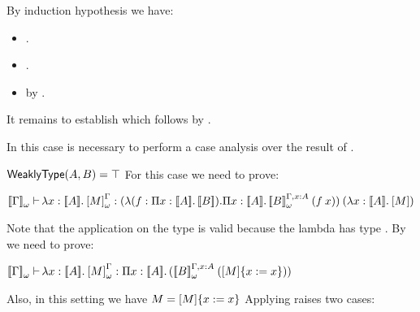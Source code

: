 \begin{Proof}
\begin{ProofCase}{\CicConv}
By induction hypothesis we have:
\begin{itemize}
    \item {}.
    \item {}.
    \item {} by .
\end{itemize}
It remains to establish
 which follows by 
\CicConv.
\end{ProofCase}

\begin{ProofCase}{\CicAbs}
In this case is necessary to perform a case analysis over the result of \weaklypropFun{}.
\begin{SubProofCase}{$\weaklypropFun[A,B] = \True$}
For this case we need to prove:
\begin{center}
$\ctyping[][\WContextTrans{\Context}]{\abs{x}{\TypeTrans{A}}{\WParamTrans{M}}}{
        \app{(\varabs{f}{\depArrow{x}{\TypeTrans{A}}{\TypeTrans{B}}}{
                       \depArrow{x}{\TypeTrans{A}}{
                         \app{\WParamTypeTrans[\Context,\typing{x}{A}]{B}}{
                              (\app{f}{x})}}})}}{
             (\abs{x}{\TypeTrans{A}}{\Trans{M}})}$
\end{center}
Note that the application on the type is valid because the lambda has type 
. By \CicConv{} we need to prove:
\begin{center}
$\ctyping[][\WContextTrans{\Context}]{\abs{x}{\TypeTrans{A}}{\WParamTrans{M}}}{
        \depArrow{x}{\TypeTrans{A}}{(
                    \app{\WParamTypeTrans[\Context,\typing{x}{A}]{B}}{(\subst{\Trans{M}}{x}{x})})}}$
\end{center}
Also, in this setting we have $M\termEq\subst{\Trans{M}}{x}{x}$ Applying \CicAbs{} raises two cases:
\end{SubProofCase}
\end{ProofCase}
\end{Proof}

